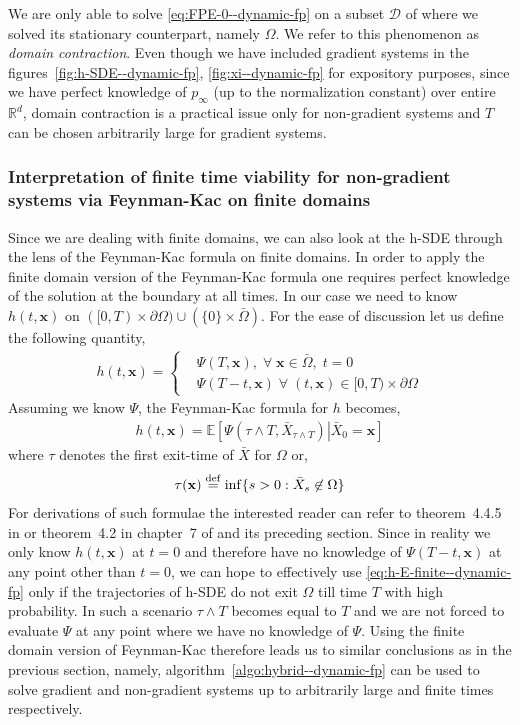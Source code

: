 We are only able to solve \eqref{eq:FPE-0--dynamic-fp} on a subset $\mathcal D$ of where we solved its stationary counterpart, namely $\Omega$. We refer to this phenomenon as \textit{domain contraction}. Even though we have included gradient systems in the figures~\ref{fig:h-SDE--dynamic-fp}, \ref{fig:xi--dynamic-fp} for expository purposes, since we have perfect knowledge of $p_\infty$ (up to the normalization constant) over entire $\mathbb R^d$, domain contraction is a practical issue only for non-gradient systems and $T$ can be chosen arbitrarily large for gradient systems. 


\subsubsection{Interpretation of finite time viability for non-gradient systems via Feynman-Kac on finite domains}\label{ssec-interpret-FK-finite--dynamic-fp}
Since we are dealing with finite domains, we can also look at the h-SDE through the lens of the Feynman-Kac formula on finite domains. In order to apply the finite domain version of the Feynman-Kac formula one requires perfect knowledge of the solution at the boundary at all times. In our case we need to know $h(t, \mathbf x)$ on $([0, T)\times{\partial\Omega}) \cup (\{0\}\times\bar{\Omega})$. For the ease of discussion let us define the following quantity,
\begin{align}
    h(t, \mathbf x) = \begin{cases}
        &\Psi(T, \mathbf x),\;\forall\;\mathbf x\in \bar{\Omega},\; t=0\\
        & \Psi(T-t, \mathbf x)\;\forall\;(t,\mathbf x)\in[0, T)\times\partial\Omega
    \end{cases}
\end{align}
Assuming we know $\Psi$, the Feynman-Kac formula for $h$ becomes,
\begin{align}
    h(t, \mathbf x) = \mathbb E\left[\left.\Psi(\tau\wedge T, \bar{X}_{\tau\wedge T})\right\vert \bar X_0=\mathbf x\right]\label{eq:h-E-finite--dynamic-fp}
\end{align}
where $\tau$ denotes the first exit-time of $\bar{X}$ for $\Omega$ or,
\begin{align}
    \tau(\mathbf x) \stackrel{\rm def}{=} \inf\{s>0: \bar X_s\not\in\Omega\} 
\end{align}
For derivations of such formulae the interested reader can refer to theorem~4.4.5 in \cite{gobet2016monte} or theorem~4.2 in chapter~7 of \cite{yong1999stochastic} and its preceding section. Since in reality we only know $h(t, \mathbf x)$ at $t=0$ and therefore have no knowledge of $\Psi(T-t, \mathbf x)$ at any point other than $t=0$, we can hope to effectively use \eqref{eq:h-E-finite--dynamic-fp} only if the trajectories of h-SDE do not exit $\Omega$ till time $T$ with high probability. In such a scenario $\tau\wedge T$ becomes equal to $T$ and we are not forced to evaluate $\Psi$ at any point where we have no knowledge of $\Psi$. Using the finite domain version of Feynman-Kac therefore leads us to similar conclusions as in the previous section, namely, algorithm~\ref{algo:hybrid--dynamic-fp} can be used to solve gradient and non-gradient systems up to arbitrarily large and finite times respectively.

